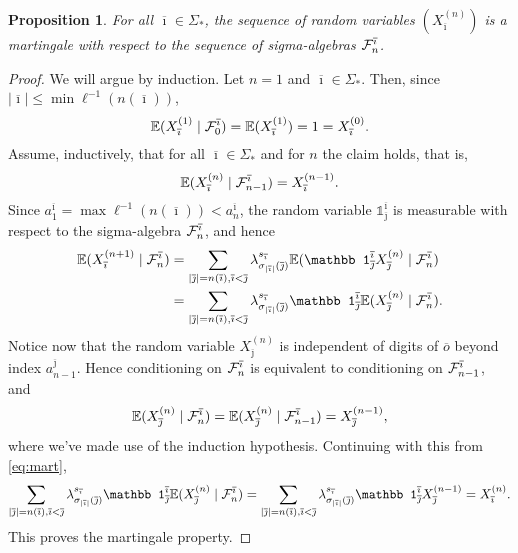 \documentclass[12pt,]{article}
\newtheorem{proposition}[theorem]{Proposition}
\theoremstyle{definition}
\theoremstyle{remark}
\renewcommand{\Bbb}[1]{\mathbb{#1}}
\newcommand{\bbE}{{\Bbb E}}
\newcommand{\cF}{{\cal F}}
\newcommand{\0}{\mathbf{0}}
\renewcommand{\le}{\leq}
\newcommand{\bi}{{\overline {\imath}}}
\newcommand{\bj}{{\overline  {\jmath}}}
\newcommand{\bo}{{\overline o}}
\begin{document}
\begin{proposition}\label{thm:martingale}
  For all $\bi\in \Sigma_*$, the sequence of random variables $(X_\bi^{(n)})$ is a martingale with
  respect to the sequence of sigma-algebras $\cF_n^\bi$.
\end{proposition}


\begin{proof}
  We will argue by induction. Let $n=1$ and $\bi\in \Sigma_*$. Then, since $|\bi|\le \min \ell^{-1}(n(\bi))$,
  \[
    \bbE (X_\bi^{(1)}\mid \cF_0^\bi)=\bbE(X_\bi^{(1)})=1=X_\bi^{(0)}.
  \]
  Assume, inductively, that for all $\bi\in\Sigma_*$ and for $n$ the claim holds, that is,
  \[
    \bbE(X_\bi^{(n)}\mid \cF_{n-1}^\bi)=X_{\bi}^{(n-1)}.
  \]
  Since $a_1^\bi=\max\ell^{-1}(n(\bi))<a_{n}^\bi$, the random variable $\mathbb 1_{\bj}^\bi$ is
  measurable with respect to the sigma-algebra $\cF_n^{\bi}$, and hence
  \begin{align}
    \bbE(X_{\bi}^{(n+1)}\mid \cF_n^{\bi})
    &=\sum_{|\bj|=n(\bi),
    \bi<\bj}\lambda_{\sigma_{|\bi|}(\bj)}^{s_\bi}\bbE(\mathbb 1^{\bi}_\bj X_{\bj}^{(n)}\mid
    \cF_n^{\bi})\nonumber\\
    &=\sum_{|\bj|=n(\bi), \bi<\bj}\lambda_{\sigma_{|\bi|}(\bj)}^{s_\bi}\mathbb 1^{\bi}_\bj\bbE( X_{\bj}^{(n)}\mid \cF_n^{\bi}).\label{eq:mart}
  \end{align}
  Notice now that the random variable $X_\bj^{(n)}$ is independent of digits of $\bo$ beyond index
  $a_{n-1}^\bj$. Hence conditioning on $\cF_n^\bi$ is equivalent to conditioning on $\cF_{n-1}^\bi$, and
  \[
    \bbE(X_\bj^{(n)}\mid \cF_n^{\bi})=\bbE(X_\bj^{(n)}\mid \cF_{n-1}^{\bi})=X_\bj^{(n-1)},
  \]
  where we've made use of the induction hypothesis. Continuing with this from \eqref{eq:mart},
  \[
    \sum_{|\bj|=n(\bi), \bi<\bj}\lambda_{\sigma_{|\bi|}(\bj)}^{s_\bi}\mathbb 1^{\bi}_\bj\bbE( X_{\bj}^{(n)}\mid \cF_n^{\bi})=\sum_{|\bj|=n(\bi), \bi<\bj}\lambda_{\sigma_{|\bi|}(\bj)}^{s_\bi}\mathbb 1^{\bi}_\bj X_{\bj}^{(n-1)}=X_\bi^{(n)}.
  \]
  This proves the martingale property.
\end{proof}
\end{document}
